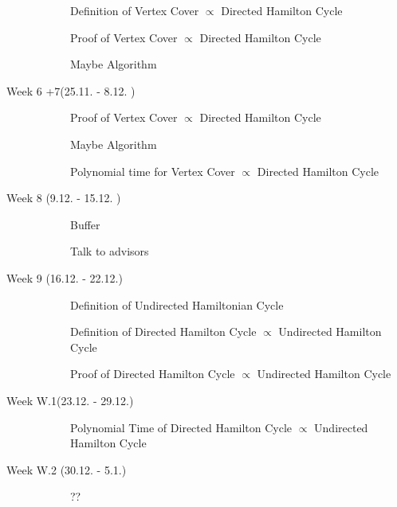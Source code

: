 \documentclass[11pt,a4paper]{scrartcl}
\begin{document}
\begin{description}
\begin{description}
			\item[\Square] Definition of Vertex Cover $\varpropto$ Directed Hamilton Cycle
		\end{description} 
		\begin{description}
			\item[\textcolor{Red}{\XBox}] Proof of Vertex Cover $\varpropto$ Directed Hamilton Cycle
			\item[\textcolor{Red}{\XBox}] Maybe Algorithm
		\end{description}
		\item[Week 6 +7(25.11. - 8.12. )] \hfill		
		\begin{description}
			\item[\Square] Proof of Vertex Cover $\varpropto$ Directed Hamilton Cycle
			\item[\Square] Maybe Algorithm
		\end{description}
		\begin{description}
			\item[\Square] Polynomial time for Vertex Cover $\varpropto$ Directed Hamilton Cycle
		\end{description}
		\item[Week 8 (9.12. - 15.12. )] \hfill 
		\begin{description}
			\item[\Square] Buffer
			\item[\Square] Talk to advisors
		\end{description}
		\item[Week 9 (16.12. - 22.12.)]\hfill 
		\begin{description}
			\item[\Square] Definition of Undirected Hamiltonian Cycle
			\item[\Square] Definition of Directed Hamilton Cycle $\varpropto$ Undirected Hamilton Cycle
			\item[\Square] Proof of Directed Hamilton Cycle $\varpropto$ Undirected Hamilton Cycle
		\end{description}
		\item[Week W.1(23.12. - 29.12.)] \hfill
		\begin{description}
			\item[\Square] Polynomial Time of Directed Hamilton Cycle $\varpropto$ Undirected Hamilton Cycle
		\end{description}
		\item[Week W.2 (30.12. - 5.1.)] \hfill 
		\begin{description}
			\item[\Square] ??

\end{description}
\end{description}
\end{document}
